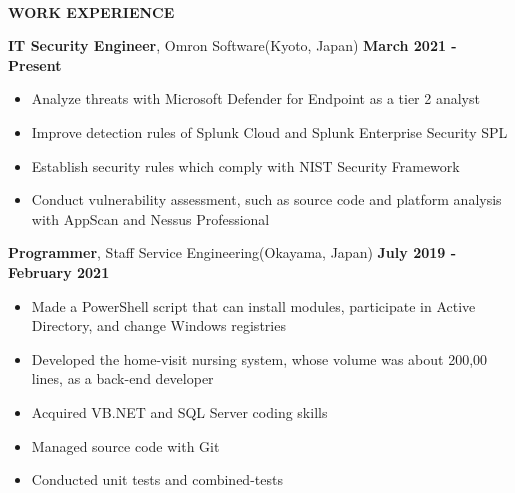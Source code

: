 \begin{center}
    \hrulefill \\
    \begin{large}
        \textbf{WORK EXPERIENCE} \\
    \end{large} 
\end{center}
\textbf{IT Security Engineer}, Omron Software(Kyoto, Japan) \hfill \textbf{March 2021 - Present}
\begin{itemize}
    \item Analyze threats with Microsoft Defender for Endpoint as a tier 2 analyst
    \item Improve detection rules of Splunk Cloud and Splunk Enterprise Security SPL
    \item Establish security rules which comply with NIST Security Framework
    \item Conduct vulnerability assessment, such as source code and platform analysis with AppScan and Nessus Professional
\end{itemize}
\textbf{Programmer}, Staff Service Engineering(Okayama, Japan) \hfill \textbf{July 2019 - February 2021}
\begin{itemize}
    \item Made a PowerShell script that can install modules, participate in Active Directory, and change Windows registries
    \item Developed the home-visit nursing system, whose volume was about 200,00 lines, as a back-end developer
    \item Acquired VB.NET and SQL Server coding skills
    \item Managed source code with Git
    \item Conducted unit tests and combined-tests
\end{itemize}